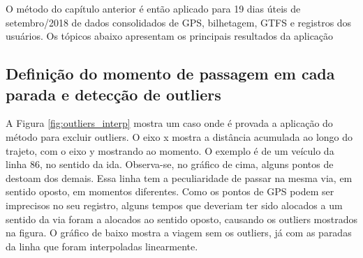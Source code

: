 \documentclass[        
    a4paper,          %
    12pt,             %
    chapter=TITLE,    %
    section=Title,    %
    subsection=Title, %
    oneside,          %
    english,          %
    spanish,          %
    brazil,           %
    fleqn             %
]{abntex2}
\begin{document}
  O método do capítulo anterior é então aplicado para 19 dias úteis de setembro/2018 de dados consolidados de GPS, bilhetagem, GTFS e registros dos usuários. Os tópicos abaixo apresentam os principais resultados da aplicação
  
  \hypertarget{definicao-do-momento-de-passagem-em-cada-parada-e-deteccao-de-outliers}{%
  \subsection{Definição do momento de passagem em cada parada e detecção de outliers}\label{definicao-do-momento-de-passagem-em-cada-parada-e-deteccao-de-outliers}}
  
  A Figura \ref{fig:outliers_interp} mostra um caso onde é provada a aplicação do método para excluir outliers. O eixo x mostra a distância acumulada ao longo do trajeto, com o eixo y mostrando ao momento. O exemplo é de um veículo da linha 86, no sentido da ida. Observa-se, no gráfico de cima, alguns pontos de destoam dos demais. Essa linha tem a peculiaridade de passar na mesma via, em sentido oposto, em momentos diferentes. Como os pontos de GPS podem ser imprecisos no seu registro, alguns tempos que deveriam ter sido alocados a um sentido da via foram a alocados ao sentido oposto, causando os outliers mostrados na figura. O gráfico de baixo mostra a viagem sem os outliers, já com as paradas da linha que foram interpoladas linearmente.
  
  \begin{figure}[!h]
  \captionsetup{width=16cm}
  \centering
  \end{figure}
  
\end{document}

